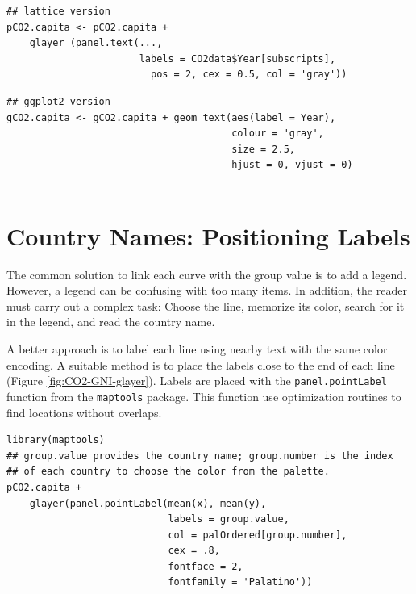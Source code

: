 \lstset{language=r,label= ,caption= ,captionpos=b,numbers=none}
\begin{lstlisting}
## lattice version
pCO2.capita <- pCO2.capita +
    glayer_(panel.text(...,
                       labels = CO2data$Year[subscripts],
                         pos = 2, cex = 0.5, col = 'gray'))
\end{lstlisting}

\lstset{language=r,label= ,caption= ,captionpos=b,numbers=none}
\begin{lstlisting}
## ggplot2 version
gCO2.capita <- gCO2.capita + geom_text(aes(label = Year),
                                       colour = 'gray',
                                       size = 2.5,
                                       hjust = 0, vjust = 0)
  
\end{lstlisting}

\section{Country Names: Positioning Labels}
\label{sec:org4616e34}
The common solution to link each curve with the group value is to add
a legend. However, a legend can be confusing with too many items. In
addition, the reader must carry out a complex task: Choose the line,
memorize its color, search for it in the legend, and read the country
name.

A better approach is to label each line using nearby text with the
same color encoding. A suitable method is to place the labels
close to the end of each line (Figure
\ref{fig:CO2-GNI-glayer}). Labels are placed with the
\texttt{panel.pointLabel} function from the \texttt{maptools} package. This
function use optimization routines to find locations without
overlaps.


\lstset{language=r,label= ,caption= ,captionpos=b,numbers=none}
\begin{lstlisting}
library(maptools)  
## group.value provides the country name; group.number is the index
## of each country to choose the color from the palette.
pCO2.capita +
    glayer(panel.pointLabel(mean(x), mean(y),
                            labels = group.value,
                            col = palOrdered[group.number],
                            cex = .8,
                            fontface = 2,
                            fontfamily = 'Palatino'))
\end{lstlisting}

